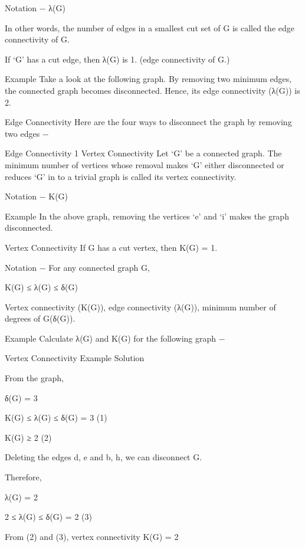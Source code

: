 Notation − λ(G)

In other words, the number of edges in a smallest cut set of G is called the edge connectivity of G.

If ‘G’ has a cut edge, then λ(G) is 1. (edge connectivity of G.)

Example
Take a look at the following graph. By removing two minimum edges, the connected graph becomes disconnected. Hence, its edge connectivity (λ(G)) is 2.

Edge Connectivity
Here are the four ways to disconnect the graph by removing two edges −

Edge Connectivity 1
Vertex Connectivity
Let ‘G’ be a connected graph. The minimum number of vertices whose removal makes ‘G’ either disconnected or reduces ‘G’ in to a trivial graph is called its vertex connectivity.

Notation − K(G)

Example
In the above graph, removing the vertices ‘e’ and ‘i’ makes the graph disconnected.

Vertex Connectivity
If G has a cut vertex, then K(G) = 1.

Notation − For any connected graph G,

K(G) ≤ λ(G) ≤ δ(G)

Vertex connectivity (K(G)), edge connectivity (λ(G)), minimum number of degrees of G(δ(G)).

Example
Calculate λ(G) and K(G) for the following graph −

Vertex Connectivity Example
Solution

From the graph,

δ(G) = 3

K(G) ≤ λ(G) ≤ δ(G) = 3 (1)

K(G) ≥ 2 (2)

Deleting the edges {d, e} and {b, h}, we can disconnect G.

Therefore,

λ(G) = 2

2 ≤ λ(G) ≤ δ(G) = 2 (3)

From (2) and (3), vertex connectivity K(G) = 2
